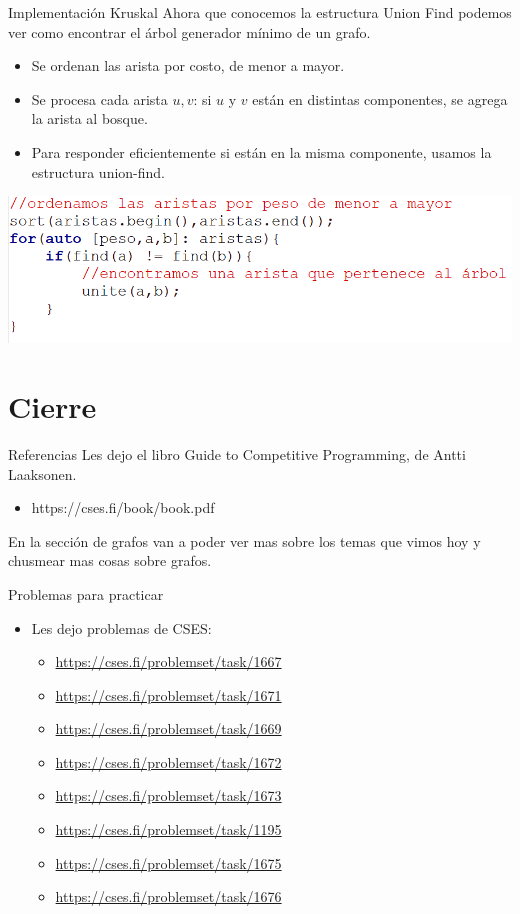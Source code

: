 \documentclass{beamer}
\begin{document}
\begin{frame}{Implementación Kruskal}
	Ahora que conocemos la estructura Union Find podemos ver como encontrar el árbol generador mínimo de un grafo.
	\begin{itemize}
		\item Se ordenan las arista por costo, de menor a mayor.
		\item Se procesa cada arista $u,v$: si $u$ y $v$ están en distintas componentes, se agrega la arista al bosque.
		\item Para responder eficientemente si están en la misma componente, usamos la estructura union-find.
	\end{itemize}
	\centering
	\includegraphics[scale=0.40]{figuras/codigo-kruskal.PNG}
\end{frame}


\section{Cierre}

\begin{frame}{Referencias}
	Les dejo el libro Guide to Competitive Programming, de Antti Laaksonen.
	\begin{itemize}
		\item https://cses.fi/book/book.pdf
	\end{itemize}
	En la sección de grafos van a poder ver mas sobre los temas que vimos hoy y chusmear mas cosas sobre grafos.
\end{frame}


\begin{frame}{Problemas para practicar}
	\begin{itemize}
		\item Les dejo problemas de CSES:
		\begin{itemize}
			\item \url{https://cses.fi/problemset/task/1667}
			\item \url{https://cses.fi/problemset/task/1671}
			\item \url{https://cses.fi/problemset/task/1669}
			\item \url{https://cses.fi/problemset/task/1672}
			\item \url{https://cses.fi/problemset/task/1673}
			\item \url{https://cses.fi/problemset/task/1195}
			\item \url{https://cses.fi/problemset/task/1675}
			\item \url{https://cses.fi/problemset/task/1676}
		\end{itemize}
	\end{itemize}
\end{frame}
\end{document}
